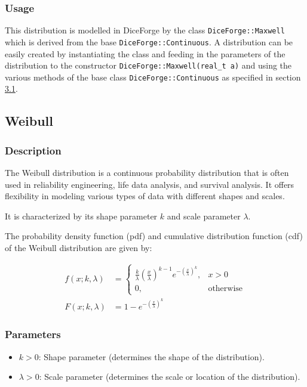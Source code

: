 \documentclass[titlepage, 11pt]{article}
\newcommand{\code}[1]
{\colorbox{light-gray}{\texttt{#1}}}
\begin{document}
\subsubsection{Usage}
This distribution is modelled in DiceForge by the class \code{DiceForge::Maxwell} which is derived from the base \code{DiceForge::Continuous}. A distribution can be easily created by instantiating the class and feeding in the parameters of the distribution to the constructor \code{DiceForge::Maxwell(real\_t a)} and using the various methods of the base class \code{DiceForge::Continuous} as specified in section \hyperref[sec:3.1]{3.1}.\newline

\subsection{Weibull}
\subsubsection{Description}
The Weibull distribution is a continuous probability distribution that is often used in reliability engineering, life data analysis, and survival analysis. It offers flexibility in modeling various types of data with different shapes and scales.

It is characterized by its shape parameter $k$ and scale parameter $\lambda$.

The probability density function (pdf) and cumulative distribution function (cdf) of the Weibull distribution are given by:

\begin{align}
f(x;k,\lambda) &= \begin{cases}
    \frac{k}{\lambda} \left(\frac{x}{\lambda}\right)^{k - 1} e^{-(\frac{x}{\lambda})^k}, & x > 0 \\
    0, & \text{otherwise}
  \end{cases} \\
F(x;k,\lambda) &= 1 - e^{-(\frac{x}{\lambda})^k}
\end{align}

\subsubsection{Parameters}
\begin{itemize}
    \item $k > 0$: Shape parameter (determines the shape of the distribution).
    \item $\lambda > 0$: Scale parameter (determines the scale or location of the distribution).
\end{itemize}
\end{document}
